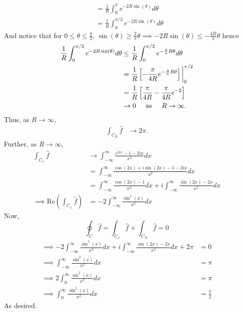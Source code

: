 \documentclass{article}
\begin{document}
\begin{itemize}
\begin{align*}
        &= \frac{1}{R}\int_0^{\pi} e^{-2R\sin(\theta)}d\theta\\
        &= \frac{1}{R}\int_0^{\pi/2}e^{-2R\sin(\theta)}d\theta
    \end{align*}
    And notice that for $0 \leq \theta \leq \frac{\pi}{2}$, $\sin(\theta) \geq \frac{2}{\pi}\theta \implies -2R\sin(\theta) \leq -\frac{4R}{\pi}\theta$ hence
    \begin{align*}
        \frac{1}{R}\int_0^{\pi/2}e^{-2R\sin(\theta)}d\theta &\leq \frac{1}{R}\int_0^{\pi/2} e^{-\frac{4}{\pi}R\theta}d\theta\\
        &= \frac{1}{R}\left[-\frac{\pi}{4R}e^{-\frac{4}{\pi}R\theta}\right]\bigg|_0^{\pi/2}\\
        &= \frac{1}{R}\left[\frac{\pi}{4R} - \frac{\pi}{4R} e^{-2}\right]\\
        &\to 0 \hspace{0.5cm} \text{as} \hspace{0.5cm} R \to \infty.
    \end{align*}
    Thus, as $R \to \infty$, 
    \begin{align*}
        \int_{C_R} \hat{f} &\to 2\pi.
    \end{align*}
    Further, as $R \to \infty$,
    \begin{align*}
        \int_{C_x}\hat{f} &\to \int_{-\infty}^{\infty} \frac{e^{2ix} - 1 - 2ix}{x^2}dx\\
        &= \int_{-\infty}^{\infty} \frac{\cos(2x) + i\sin(2x) - 1 - 2ix}{x^2}dx\\
        &= \int_{-\infty}^{\infty}\frac{\cos(2x) - 1}{x^2}dx + i\int_{-\infty}^{\infty} \frac{\sin(2x) - 2x}{x^2}dx\\
        \implies \text{Re}\left(\int_{C_x}\hat{f}\right) &= -2\int_{-\infty}^{\infty}\frac{\sin^2(x)}{x^2}dx
    \end{align*}
    Now,
    \[\oint_{C}\hat{f} = \int_{C_x}\hat{f} + \int_{C_R}\hat{f} = 0\]
    \begin{align*}
        \implies -2\int_{-\infty}^{\infty}\frac{\sin^2(x)}{x^2}dx + i\int_{-\infty}^{\infty}\frac{\sin(2x) - 2x}{x^2}dx + 2\pi &= 0\\
        \implies \int_{-\infty}^{\infty}\frac{\sin^2(x)}{x^2}dx &= \pi\\
        \implies 2\int_0^{\infty}\frac{\sin^2(x)}{x^2}dx &= \pi\\
        \implies \int_0^{\infty} \frac{\sin^2(x)}{x^2}dx &= \frac{\pi}{2}
    \end{align*}
    As desired.

\end{itemize}
\end{document}
